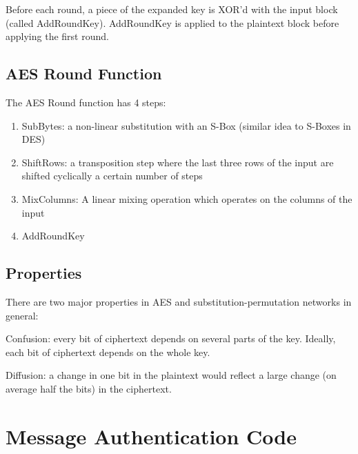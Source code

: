 \documentclass{article}
\begin{document}
\begin{multicols}{2}
Before each round, a piece of the expanded key is XOR'd with the input block (called AddRoundKey). AddRoundKey is applied to the plaintext block before applying the first round. 

\subsection{AES Round Function}

The AES Round function has 4 steps:

\begin{enumerate}
    \item SubBytes: a non-linear substitution with an S-Box (similar idea to S-Boxes in DES)
    \item ShiftRows: a transposition step where the last three rows of the input are shifted cyclically a certain number of steps
    \item MixColumns: A linear mixing operation which operates on the columns of the input
    \item AddRoundKey 
\end{enumerate}

\subsection{Properties}

There are two major properties in AES and substitution-permutation networks in general:

Confusion: every bit of ciphertext depends on several parts of the key. Ideally, each bit of ciphertext depends on the whole key.

Diffusion: a change in one bit in the plaintext would reflect a large change (on average half the bits) in the ciphertext.

\section{Message Authentication Code}



\end{multicols}
\end{document}
